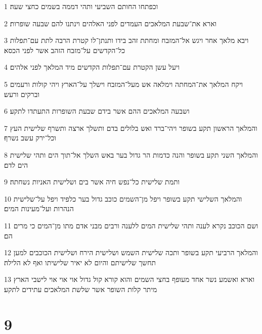 \par 1 וכפתחו החותם השביעי ותהי דממה בשמים כחצי שעה׃
\par 2 וארא את־שבעת המלאכים העמדים לפני האלהים וינתנו להם שבעה שופרות׃
\par 3 ויבא מלאך אחר ויגש אל־המזבח ומחתת זהב בידו ותנתן־לו קטרת הרבה לתת עם־תפלות כל־הקדשים על־מזבח הזהב אשר לפני הכסא׃
\par 4 ויעל עשן הקטרת עם־תפלות הקדשים מיד המלאך לפני אלהים׃
\par 5 ויקח המלאך את־המחתה וימלאה אש מעל־המזבח וישלך על־הארץ ויהי קולות ורעמים וברקים ורעש׃
\par 6 ושבעה המלאכים ההם אשר בידם שבעת השופרות התעתדו לתקע׃
\par 7 והמלאך הראשון תקע בשופר ויהי־ברד ואש בלולים בדם ותשלך ארצה ותשרף שלישית העץ וכל־ירק עשב נשרף׃
\par 8 והמלאך השני תקע בשופר והנה כדמות הר גדול בער באש השלך אל־תוך הים ותהי שלישית הים לדם׃
\par 9 ותמת שלישית כל־נפש חיה אשר בים ושלישית האניות נשחתה׃
\par 10 והמלאך השלישי תקע בשופר ויפל מן־השמים כוכב גדול בער כלפיד ויפל על־שלישית הנהרות ועל־מעינות המים׃
\par 11 ושם הכוכב נקרא לענה ותהי שלישית המים ללענה ורבים מבני אדם מתו מן־המים כי מרים הם׃
\par 12 והמלאך הרביעי תקע בשופר ותכה שלישית השמש ושלישית הירח ושלישית הכוכבים למען תחשך שלישיתם והיום לא יאיר שלישיתו ואף לא הלילה׃
\par 13 וארא ואשמע נשר אחד מעופף בחצי השמים והוא קורא קול גדול אוי אוי אוי לישבי הארץ מיתר קלות השופר אשר שלשת המלאכים עתידים לתקע׃

\chapter{9}


